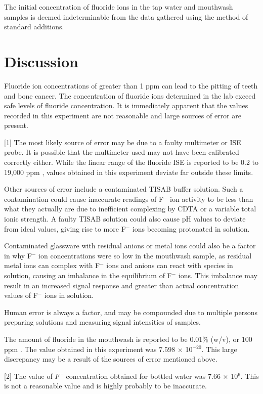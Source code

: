 \documentclass[journal=jacsat,manuscript=article,layout=twocolumn]{achemso}
\begin{document}
The initial concentration of fluoride ions in the tap water and mouthwash
samples is deemed indeterminable from the data gathered using the method of
standard additions.

\section {Discussion}
Fluoride ion concentrations of greater than 1 ppm can lead to the pitting of
teeth and bone cancer.
The concentration of fluoride ions determined in the lab exceed safe levels of
fluoride concentration. It is immediately apparent that the values recorded in
this experiment are not reasonable and large sources of error are present.

[1] The most likely source of error may be due to a faulty multimeter or ISE probe. It is possible
that the multimeter used may not have been calibrated correctly either. While
the linear range of the fluoride ISE is reported to be 0.2 to 19,000 ppm
\cite{lab_man}, values obtained in this experiment deviate far outside these
limits.

Other sources of error include a contaminated TISAB buffer solution. Such a
contamination could cause inaccurate readings of F$^-$ ion activity to be
less than what they actually are due to inefficient complexing
by CDTA or a variable total ionic strength. 
A faulty TISAB solution could also cause pH values to deviate from
ideal values, giving rise to more F$^-$ ions becoming protonated in solution.

Contaminated glassware with residual anions or metal ions could also be a factor
in why F$^-$ ion concentrations were so low in the mouthwash sample, as residual
metal ions can complex with F$^-$ ions and anions can react with species in
solution, causing an imbalance in the equilibrium of F$^-$ ions. This imbalance
may result in an increased signal response and greater than actual concentration
values of F$^-$ ions in solution.

Human error is always a factor, and may be compounded due to multiple persons
preparing solutions and measuring signal intensities of samples.

The amount of fluoride in the mouthwash is reported to be 0.01\% (w/v), or 100
ppm \cite{lab_man}. The value obtained in this experiment was 7.598 $\times$ 10$^{-20}$. This
large discrepancy may be a result of the sources of error mentioned above.

[2] The value of $F^-$ concentration obtained for bottled water was 7.66 $\times$
10$^6$. This is not a reasonable value and is highly probably to be inaccurate.
\end{document}
